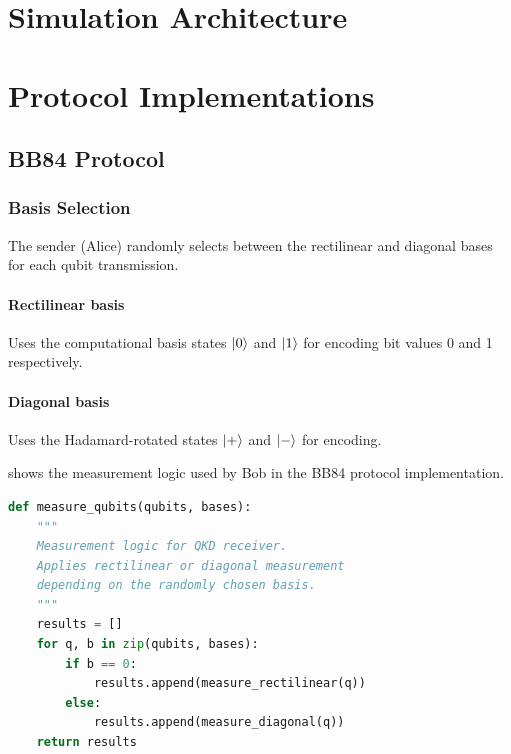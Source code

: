 \documentclass[10pt, a4paper]{report}
\begin{document}
\section{Simulation Architecture}


\section{Protocol Implementations}


\subsection{BB84 Protocol}

\subsubsection{Basis Selection} The sender (Alice) randomly selects
between the rectilinear and diagonal bases for each qubit transmission.

\paragraph{Rectilinear basis} Uses the computational basis states
$\ket{0}$ and $\ket{1}$ for encoding bit values 0 and 1 respectively.

\paragraph{Diagonal basis} Uses the Hadamard-rotated states
$\ket{+}$ and $\ket{-}$ for encoding.

 shows the measurement logic used by Bob
in the BB84 protocol implementation.

\begin{lstlisting}[language=Python, caption={BB84 Bob's measurement logic}, label={lst:measure}]
def measure_qubits(qubits, bases):
    """
    Measurement logic for QKD receiver.
    Applies rectilinear or diagonal measurement
    depending on the randomly chosen basis.
    """
    results = []
    for q, b in zip(qubits, bases):
        if b == 0:
            results.append(measure_rectilinear(q))
        else:
            results.append(measure_diagonal(q))
    return results
\end{lstlisting}
\end{document}
